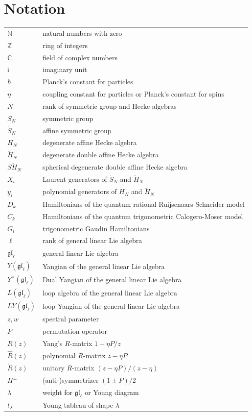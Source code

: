 \documentclass[11pt]{report}
\theoremstyle{definition}
\theoremstyle{remark}
\theoremstyle{remark}
\newcommand{\N}{\mathbb{N}}
\newcommand{\Z}{\mathbb{Z}}
\newcommand{\C}{\mathbb{C}}
\newcommand{\I}{\mathrm{i}}
\begin{document}

\chapter*{Notation}\label{chapter:notation}

\begin{tabular}{l|l}
$\N$ & natural numbers with zero \\
$\Z$ & ring of integers \\
$\C$ & field of complex numbers \\
$\I$ & imaginary unit \\
$\hbar$ & Planck's constant for particles \\
$\eta$ & coupling constant for particles or Planck's constant for spins \\
$N$ & rank of symmetric group and Hecke algebras \\
$S_N$ & symmetric group \\
$\dot S_N$ & affine symmetric group \\
$\dot H_N$ & degenerate affine Hecke algebra \\
$\ddot H_N$ & degenerate double affine Hecke algebra \\
$S\ddot H_N$ & spherical degenerate double affine Hecke algebra \\
$X_i$ & Laurent generators of $\dot S_N$ and $\ddot H_N$ \\
$y_i$ & polynomial generators of $\dot H_N$ and $\ddot H_N$ \\
$D_k$ & Hamiltonians of the quantum rational Ruijsenaars-Schneider model \\
$C_k$ & Hamiltonians of the quantum trigonometric Calogero-Moser model \\
$G_i$ & trigonometric Gaudin Hamiltonians \\
$\ell$ & rank of general linear Lie algebra \\
$\mathfrak{gl}_\ell$ & general linear Lie algebra \\
$Y(\mathfrak{gl}_\ell)$ & Yangian of the general linear Lie algebra \\
$Y^\vee(\mathfrak{gl}_\ell)$ & Dual Yangian of the general linear Lie algebra \\
$L(\mathfrak{gl}_\ell)$ & loop algebra of the general linear Lie algebra \\
$LY(\mathfrak{gl}_\ell)$ & loop Yangian of the general linear Lie algebra \\
$z,w$ & spectral parameter \\
$P$ & permutation operator \\
$R(z)$ & Yang's $R$-matrix $1-\eta P/z$ \\
$\hat R(z)$ & polynomial $R$-matrix $z-\eta P$ \\
$\check R(z)$ & unitary $R$-matrix $(z-\eta P)/(z-\eta)$ \\
$\Pi^\pm$ & (anti-)symmetrizer $(1 \pm P)/2$ \\
$\lambda$ & weight for $\mathfrak{gl}_\ell$ or Young diagram \\
$t_\lambda$ & Young tableau of shape $\lambda$
\end{tabular}
\end{document}
